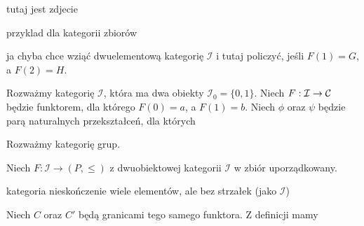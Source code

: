 {\color{red}tutaj jest zdjecie

przyklad dla kategorii zbiorów

ja chyba chce wziąć dwuelementową kategorię $\mathcal{I}$ i tutaj policzyć, jeśli $F(1)=G$, a $F(2)=H$.
}
  
Rozważmy kategorię $\mathcal{I}$, która ma dwa obiekty $\mathcal{I}_0=\{0,1\}$. Niech $F:\mathcal{I}\to \mathcal{C}$ będzie funktorem, dla którego $F(0)=a$, a $F(1)=b$. Niech $\phi$ oraz $\psi$ będzie parą naturalnych przekształceń, dla których
\begin{center}
\end{center}

\begin{example}[m]
\item 


  \item Rozważmy kategorię grup. 
    \begin{center}
    \end{center}
    \begin{center}
    \end{center}
  \item Niech $F:\mathcal{I}\to (P, \leq)$ z dwuobiektowej kategorii $\mathcal{I}$ w zbiór uporządkowany.
\end{example}

kategoria nieskończenie wiele elementów, ale bez strzałek (jako $\mathcal{I}$)
 

Niech $C$ oraz $C'$ będą granicami tego samego funktora. Z definicji mamy
\begin{center}
\end{center}

